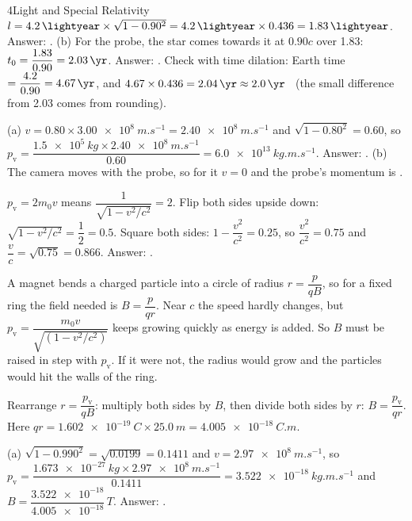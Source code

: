 \begin{chapteranswers}{4}{Light and Special Relativity}
        $l = \qty{4.2}{\lightyear} \times \sqrt{1 - 0.90^2} = \qty{4.2}{\lightyear} \times 0.436
        = \qty{1.83}{\lightyear}$. Answer: .
        (b) For the probe, the star comes towards it at $0.90c$ over \qty{1.83}{\lightyear}:
        $t_0 = \dfrac{1.83}{0.90} = \qty{2.03}{\yr}$. Answer: .
        Check with time dilation: Earth time $= \dfrac{4.2}{0.90} = \qty{4.67}{\yr}$, and
        $4.67 \times 0.436 = \qty{2.04}{\yr} \approx \qty{2.0}{\yr}$ \cmark\ (the small
        difference from 2.03 comes from rounding).
  \item (a) $v = 0.80 \times \qty{3.00e8}{m.s^{-1}} = \qty{2.40e8}{m.s^{-1}}$ and
        $\sqrt{1 - 0.80^2} = 0.60$, so
        $p_\mathrm{v} = \dfrac{\qty{1.5e5}{kg} \times \qty{2.40e8}{m.s^{-1}}}{0.60}
        = \qty{6.0e13}{kg.m.s^{-1}}$. Answer: .
        (b) The camera moves with the probe, so for it $v = 0$ and the probe's momentum is
        .
  \item $p_\mathrm{v} = 2m_0v$ means $\dfrac{1}{\sqrt{1 - v^2/c^2}} = 2$. Flip both sides
        upside down: $\sqrt{1 - v^2/c^2} = \dfrac{1}{2} = 0.5$. Square both sides: $1 - \dfrac{v^2}{c^2} = 0.25$, so
        $\dfrac{v^2}{c^2} = 0.75$ and $\dfrac{v}{c} = \sqrt{0.75} = 0.866$. Answer:
        .
  \item A magnet bends a charged particle into a circle of radius $r = \dfrac{p}{qB}$, so for a
        fixed ring the field needed is $B = \dfrac{p}{qr}$. Near $c$ the speed hardly changes,
        but $p_\mathrm{v} = \dfrac{m_0v}{\sqrt{\left(1 - v^2/c^2\right)}}$ keeps growing quickly
        as energy is added. So $B$ must be raised in step with $p_\mathrm{v}$. If it were not, the
        radius would grow and the particles would hit the walls of the ring.
  \item Rearrange $r = \dfrac{p_\mathrm{v}}{qB}$: multiply both sides by $B$, then divide both
        sides by $r$: $B = \dfrac{p_\mathrm{v}}{qr}$. Here
        $qr = \qty{1.602e-19}{C} \times \qty{25.0}{m} = \qty{4.005e-18}{C.m}$.\par
        (a) $\sqrt{1 - 0.990^2} = \sqrt{0.0199} = 0.1411$ and
        $v = \qty{2.97e8}{m.s^{-1}}$, so
        $p_\mathrm{v} = \dfrac{\qty{1.673e-27}{kg} \times \qty{2.97e8}{m.s^{-1}}}{0.1411}
        = \qty{3.522e-18}{kg.m.s^{-1}}$ and
        $B = \dfrac{\num{3.522e-18}}{\num{4.005e-18}}\,\si{T}$. Answer:
        .\par

\end{chapteranswers}
